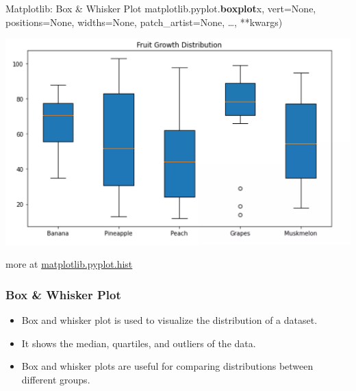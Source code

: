 \documentclass{beamer}
\begin{document}
    \begin{frame}[fragile]{Matplotlib: Box \& Whisker Plot}
        matplotlib.pyplot.\textbf{boxplot}x, vert=None, positions=None, widths=None, patch_artist=None, \dots, **kwargs)\\
        \begin{center}
            \includegraphics[width=\textwidth,height=0.6\textheight,keepaspectratio]{figures/boxplot.png}\\
        \end{center}
        more at \href{https://matplotlib.org/stable/api/_as_gen/matplotlib.pyplot.hist.html}{matplotlib.pyplot.hist}
    \end{frame}
    \begin{frame}
        \frametitle{Box \& Whisker Plot}
        \begin{itemize}
            \item Box and whisker plot is used to visualize the distribution of a dataset.
            \item It shows the median, quartiles, and outliers of the data.
            \item Box and whisker plots are useful for comparing distributions between different groups.
        \end{itemize}
    \end{frame}
\end{document}
